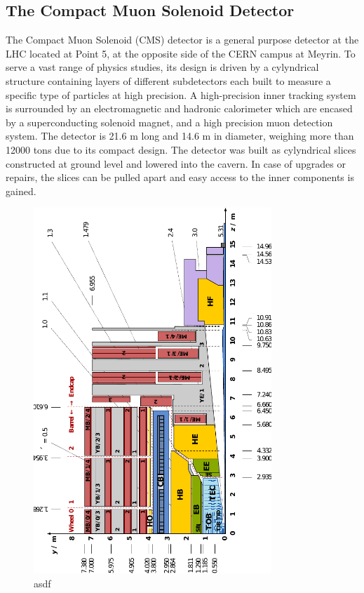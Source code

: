 \subsection{The Compact Muon Solenoid Detector}

The Compact Muon Solenoid (CMS) detector is a general purpose detector at the
LHC located at Point 5, at the opposite side of the CERN campus at Meyrin. To
serve a vast range of physics studies, its design is driven by a cylyndrical
structure containing layers of different subdetectors each built
to measure a specific type of particles at high precision. A high-precision
inner tracking system is surrounded by an electromagnetic and hadronic
calorimeter which are encased by a superconducting solenoid magnet, and a high
precision muon detection system. The detector is 21.6 m long and 14.6 m in
diameter, weighing more than 12000 tons due to its compact design. The detector
was built as cylyndrical slices constructed at ground level and lowered into the
cavern. In case of upgrades or repairs, the slices can be pulled apart and easy
access to the inner components is gained. 

\begin{figure}[htp]
    \centering
    \includegraphics[width=0.8\textwidth]{figures/cms_detector/cms_longitudinal_section.pdf}
    \caption[Longitudinal section of the CMS detector]{asdf}
    \label{fig:cms:longitudinal_section}
\end{figure}

